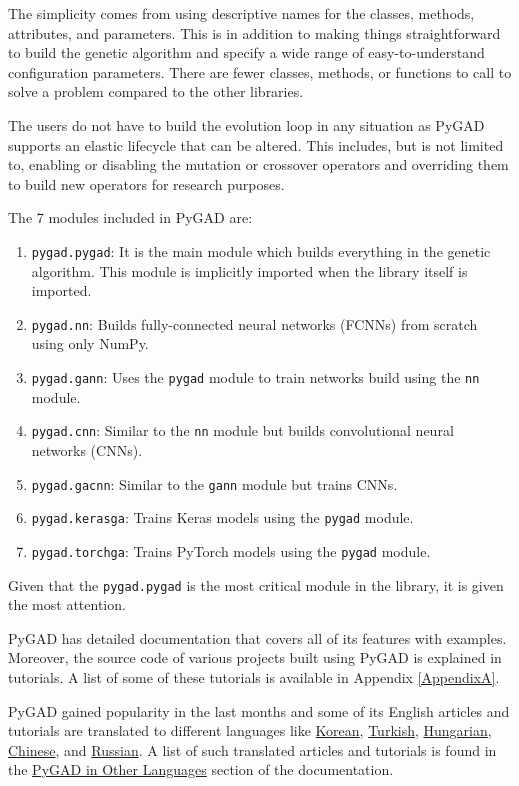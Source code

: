 \documentclass[conference]{IEEEtran}
\begin{document}
The simplicity comes from using descriptive names for the classes, methods, attributes, and parameters. This is in addition to making things straightforward to build the genetic algorithm and specify a wide range of easy-to-understand configuration parameters. There are fewer classes, methods, or functions to call to solve a problem compared to the other libraries. 

The users do not have to build the evolution loop in any situation as PyGAD supports an elastic lifecycle that can be altered. This includes, but is not limited to, enabling or disabling the mutation or crossover operators and overriding them to build new operators for research purposes.

The 7 modules included in PyGAD are:
\begin{enumerate}
    \item \texttt{pygad.pygad}: It is the main module which builds everything in the genetic algorithm. This module is implicitly imported when the library itself is imported.
    \item \texttt{pygad.nn}: Builds fully-connected neural networks (FCNNs) from scratch using only NumPy.
    \item \texttt{pygad.gann}: Uses the \texttt{pygad} module to train networks build using the \texttt{nn} module.
    \item \texttt{pygad.cnn}: Similar to the \texttt{nn} module but builds convolutional neural networks (CNNs).
    \item \texttt{pygad.gacnn}: Similar to the \texttt{gann} module but trains CNNs.
    \item \texttt{pygad.kerasga}: Trains Keras models using the \texttt{pygad} module.
    \item \texttt{pygad.torchga}: Trains PyTorch models using the \texttt{pygad} module.
\end{enumerate}

Given that the \texttt{pygad.pygad} is the most critical module in the library, it is given the most attention.

PyGAD has detailed documentation that covers all of its features with examples. Moreover, the source code of various projects built using PyGAD is explained in tutorials. A list of some of these tutorials is available in Appendix \ref{AppendixA}.

PyGAD gained popularity in the last months and some of its English articles and tutorials are translated to different languages like \href{https://pygad.readthedocs.io/en/latest/Footer.html#korean}{Korean}, \href{https://pygad.readthedocs.io/en/latest/Footer.html#turkish}{Turkish}, \href{https://pygad.readthedocs.io/en/latest/Footer.html#hungarian}{Hungarian}, \href{https://pygad.readthedocs.io/en/latest/Footer.html#chinese}{Chinese}, and \href{https://pygad.readthedocs.io/en/latest/Footer.html#russian}{Russian}. A list of such translated articles and tutorials is found in the \href{https://pygad.readthedocs.io/en/latest/Footer.html#pygad-in-other-languages}{PyGAD in Other Languages} section of the documentation.
\end{document}
